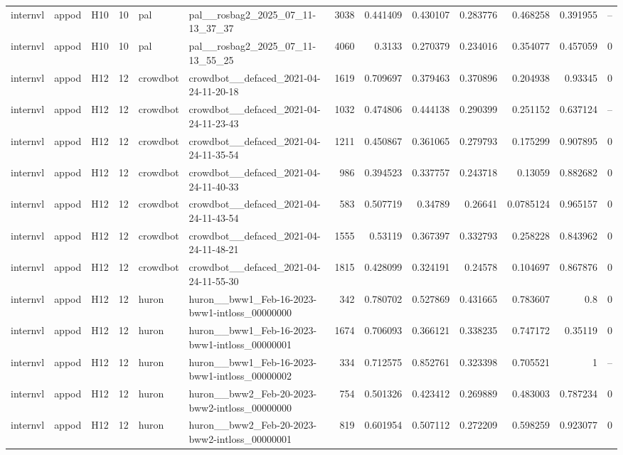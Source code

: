 \begin{longtable}{lllrllrrrrrrr}
internvl & appod & H10 & 10 & pal & pal\_\_rosbag2\_2025\_07\_11-13\_37\_37 & 3038 & 0.441409 & 0.430107 & 0.283776 & 0.468258 & 0.391955 & -- \\
internvl & appod & H10 & 10 & pal & pal\_\_rosbag2\_2025\_07\_11-13\_55\_25 & 4060 & 0.3133 & 0.270379 & 0.234016 & 0.354077 & 0.457059 & 0 \\
internvl & appod & H12 & 12 & crowdbot & crowdbot\_\_defaced\_2021-04-24-11-20-18 & 1619 & 0.709697 & 0.379463 & 0.370896 & 0.204938 & 0.93345 & 0 \\
internvl & appod & H12 & 12 & crowdbot & crowdbot\_\_defaced\_2021-04-24-11-23-43 & 1032 & 0.474806 & 0.444138 & 0.290399 & 0.251152 & 0.637124 & -- \\
internvl & appod & H12 & 12 & crowdbot & crowdbot\_\_defaced\_2021-04-24-11-35-54 & 1211 & 0.450867 & 0.361065 & 0.279793 & 0.175299 & 0.907895 & 0 \\
internvl & appod & H12 & 12 & crowdbot & crowdbot\_\_defaced\_2021-04-24-11-40-33 & 986 & 0.394523 & 0.337757 & 0.243718 & 0.13059 & 0.882682 & 0 \\
internvl & appod & H12 & 12 & crowdbot & crowdbot\_\_defaced\_2021-04-24-11-43-54 & 583 & 0.507719 & 0.34789 & 0.26641 & 0.0785124 & 0.965157 & 0 \\
internvl & appod & H12 & 12 & crowdbot & crowdbot\_\_defaced\_2021-04-24-11-48-21 & 1555 & 0.53119 & 0.367397 & 0.332793 & 0.258228 & 0.843962 & 0 \\
internvl & appod & H12 & 12 & crowdbot & crowdbot\_\_defaced\_2021-04-24-11-55-30 & 1815 & 0.428099 & 0.324191 & 0.24578 & 0.104697 & 0.867876 & 0 \\
internvl & appod & H12 & 12 & huron & huron\_\_bww1\_Feb-16-2023-bww1-intloss\_00000000 & 342 & 0.780702 & 0.527869 & 0.431665 & 0.783607 & 0.8 & 0 \\
internvl & appod & H12 & 12 & huron & huron\_\_bww1\_Feb-16-2023-bww1-intloss\_00000001 & 1674 & 0.706093 & 0.366121 & 0.338235 & 0.747172 & 0.35119 & 0 \\
internvl & appod & H12 & 12 & huron & huron\_\_bww1\_Feb-16-2023-bww1-intloss\_00000002 & 334 & 0.712575 & 0.852761 & 0.323398 & 0.705521 & 1 & -- \\
internvl & appod & H12 & 12 & huron & huron\_\_bww2\_Feb-20-2023-bww2-intloss\_00000000 & 754 & 0.501326 & 0.423412 & 0.269889 & 0.483003 & 0.787234 & 0 \\
internvl & appod & H12 & 12 & huron & huron\_\_bww2\_Feb-20-2023-bww2-intloss\_00000001 & 819 & 0.601954 & 0.507112 & 0.272209 & 0.598259 & 0.923077 & 0 \\

\end{longtable}
